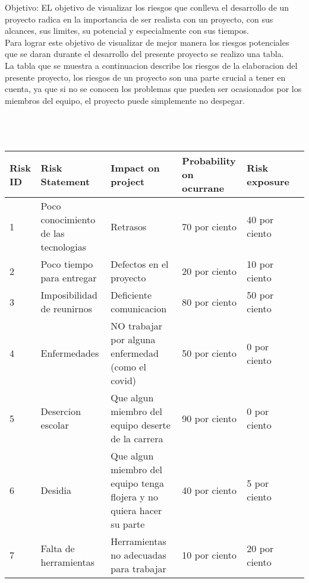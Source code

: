 \documentclass{article}
\begin{document}
	Objetivo:
	EL objetivo de visualizar los riesgos que conlleva el desarrollo de un proyecto radica en la importancia de ser realista con un proyecto, con sus alcances, sus limites, su potencial y especialmente con sus tiempos. \\
	Para lograr este objetivo de visualizar de mejor manera los riesgos potenciales que se daran durante el desarrollo del presente proyecto se realizo una tabla.\\ 
	La tabla que se muestra a continuacion describe los riesgos de la elaboracion del presente proyecto, los riesgos de un proyecto son una parte crucial a tener en cuenta, ya que si no se conocen los problemas que pueden ser ocasionados por los miembros del equipo, el proyecto puede simplemente no despegar.	\\
	\\
	\\
	\\
\begin{tabular}{|p{2cm}|p{2cm}|p{2cm}| p{2cm}| p{2cm}| p{2cm}|}
\hline 	
Risk ID& Risk Statement& Impact on project&Probability on ocurrane & Risk exposure  \\\hline 

1& Poco conocimiento de las tecnologias & Retrasos& 70 por ciento & 40 por ciento \\\hline 

2& Poco tiempo para entregar& Defectos en el proyecto& 20 por ciento & 10 por ciento \\\hline 

3& Imposibilidad de reunirnos& Deficiente comunicacion& 80 por ciento & 50 por ciento \\\hline 

4& Enfermedades& NO trabajar por alguna enfermedad (como el covid)& 50 por ciento & 0 por ciento \\\hline 

5& Desercion escolar& Que algun miembro del equipo deserte de la carrera& 90 por ciento & 0 por ciento \\\hline 

6& Desidia& Que algun miembro del equipo tenga flojera y no quiera hacer su parte& 40 por ciento & 5 por ciento \\\hline 

7& Falta de herramientas & Herramientas no adecuadas para trabajar& 10 por ciento & 20 por ciento \\
\hline 









	
\end{tabular}
\\
\\
\\
\end{document}
